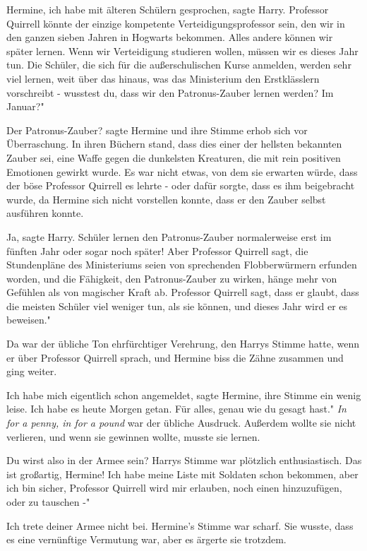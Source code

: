 \glqq{}Hermine, ich habe mit älteren Schülern gesprochen\grqq{}, sagte Harry.
\glqq{}Professor Quirrell könnte der einzige kompetente Verteidigungsprofessor
sein, den wir in den ganzen sieben Jahren in Hogwarts bekommen. Alles andere
können wir später lernen. Wenn wir Verteidigung studieren wollen, müssen wir es
dieses Jahr tun. Die Schüler, die sich für die außerschulischen Kurse anmelden,
werden sehr viel lernen, weit über das hinaus, was das Ministerium den
Erstklässlern vorschreibt - wusstest du, dass wir den Patronus-Zauber lernen
werden? Im Januar?"

\glqq{}Der Patronus-Zauber?\grqq{} sagte Hermine und ihre Stimme erhob sich vor
Überraschung. In ihren Büchern stand, dass dies einer der hellsten bekannten
Zauber sei, eine Waffe gegen die dunkelsten Kreaturen, die mit rein positiven
Emotionen gewirkt wurde. Es war nicht etwas, von dem sie erwarten würde, dass
der böse Professor Quirrell es lehrte - oder dafür sorgte, dass es ihm
beigebracht wurde, da Hermine sich nicht vorstellen konnte, dass er den Zauber
selbst ausführen konnte.

\glqq{}Ja\grqq{}, sagte Harry. \glqq{}Schüler lernen den Patronus-Zauber
normalerweise erst im fünften Jahr oder sogar noch später! Aber Professor
Quirrell sagt, die Stundenpläne des Ministeriums seien von sprechenden
Flobberwürmern erfunden worden, und die Fähigkeit, den Patronus-Zauber zu
wirken, hänge mehr von Gefühlen als von magischer Kraft ab. Professor Quirrell
sagt, dass er glaubt, dass die meisten Schüler viel weniger tun, als sie können,
und dieses Jahr wird er es beweisen."

Da war der übliche Ton ehrfürchtiger Verehrung, den Harrys Stimme hatte, wenn er
über Professor Quirrell sprach, und Hermine biss die Zähne zusammen und ging
weiter.

\glqq{}Ich habe mich eigentlich schon angemeldet\grqq{}, sagte Hermine, ihre
Stimme ein wenig leise. \glqq{}Ich habe es heute Morgen getan. Für alles, genau
wie du gesagt hast." \emph{ In for a penny, in for a pound} war der übliche
Ausdruck. Außerdem wollte sie nicht verlieren, und wenn sie gewinnen wollte,
musste sie lernen.

\glqq{}Du wirst also in der Armee sein?\grqq{} Harrys Stimme war plötzlich
enthusiastisch. \glqq{}Das ist großartig, Hermine! Ich habe meine Liste mit
Soldaten schon bekommen, aber ich bin sicher, Professor Quirrell wird mir
erlauben, noch einen hinzuzufügen, oder zu tauschen -"

\glqq{}Ich trete deiner Armee nicht bei.\grqq{} Hermine's Stimme war scharf. Sie
wusste, dass es eine vernünftige Vermutung war, aber es ärgerte sie trotzdem.

